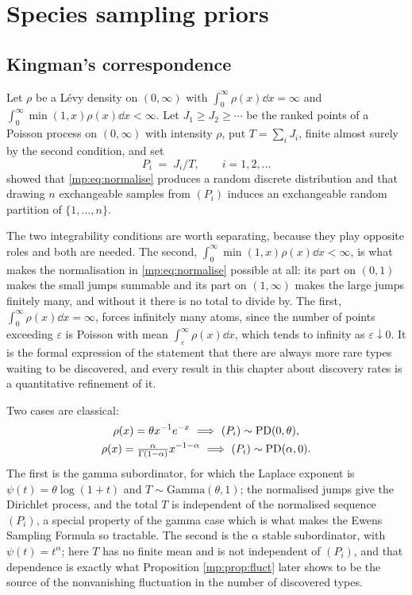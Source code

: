 \section{Species sampling priors}
\label{mp:sec:kingman}

\subsection{Kingman's correspondence}

Let $\rho$ be a L\'evy density on $(0,\infty)$ with $\int_0^\infty\rho(x)\dd x=\infty$ and
$\int_0^\infty\min(1,x)\rho(x)\dd x<\infty$. Let $J_1\ge J_2\ge\cdots$ be the ranked points of a Poisson
process on $(0,\infty)$ with intensity $\rho$, put $T=\sum_iJ_i$, finite almost surely by
the second condition, and set
\begin{equation}
P_i \;=\; J_i/T,\qquad i=1,2,\dots
\label{mp:eq:normalise}
\end{equation}
\citet{mp:kingman1975} showed that \eqref{mp:eq:normalise} produces a random discrete
distribution and that drawing $n$ exchangeable samples from $(P_i)$ induces an exchangeable
random partition of $\{1,\dots,n\}$.

The two integrability conditions are worth separating, because they play opposite roles and
both are needed. The second, $\int_0^\infty\min(1,x)\rho(x)\dd x<\infty$, is what makes the
normalisation in \eqref{mp:eq:normalise} possible at all: its part on $(0,1)$ makes the small
jumps summable and its part on $(1,\infty)$ makes the large jumps finitely many, and without
it there is no
total to divide by. The first, $\int_0^\infty\rho(x)\dd x=\infty$, forces infinitely many
atoms, since the number of points exceeding $\varepsilon$ is Poisson with mean $\int_\varepsilon^\infty\rho(x)\dd x$, which tends to infinity as $\varepsilon\downarrow0$. It is the
formal expression of the statement that there are always more rare types waiting to be
discovered, and every result in this chapter about discovery rates is a quantitative refinement
of it.

Two cases are classical:
\[
\begin{gathered}
\rho(x)=\theta x^{-1}e^{-x}\ \Longrightarrow\ (P_i)\sim\mathrm{PD}(0,\theta),
\\
\rho(x)=\tfrac{\alpha}{\Gamma(1-\alpha)}x^{-1-\alpha}\ \Longrightarrow\
(P_i)\sim\mathrm{PD}(\alpha,0).
\end{gathered}
\]
The first is the gamma subordinator, for which the Laplace exponent is
$\psi(t)=\theta\log(1+t)$ and $T\sim\mathrm{Gamma}(\theta,1)$; the normalised jumps give the
Dirichlet process, and the total $T$ is independent of the normalised sequence $(P_i)$, a
special property of the gamma case which is what makes the Ewens Sampling Formula so
tractable. The second is the $\alpha$ stable subordinator, with $\psi(t)=t^\alpha$; here $T$
has no finite mean and is not independent of $(P_i)$, and that dependence is exactly what
Proposition \ref{mp:prop:fluct} later shows to be the source of the nonvanishing fluctuation in
the number of discovered types.

